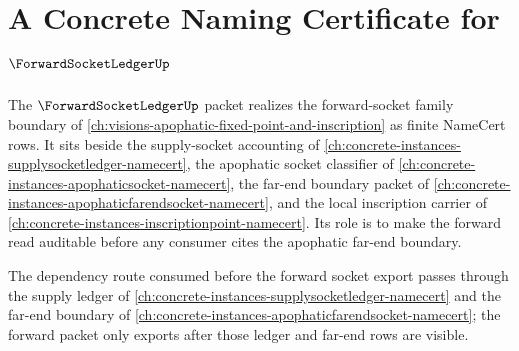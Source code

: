 \chapter{A Concrete Naming Certificate for $\ForwardSocketLedgerUp$}
\label{ch:concrete-instances-forward-socket-ledger-namecert}

The $\ForwardSocketLedgerUp$ packet realizes the forward-socket family boundary of \autoref{ch:visions-apophatic-fixed-point-and-inscription} as finite NameCert rows. It sits beside the supply-socket accounting of \autoref{ch:concrete-instances-supplysocketledger-namecert}, the apophatic socket classifier of \autoref{ch:concrete-instances-apophaticsocket-namecert}, the far-end boundary packet of \autoref{ch:concrete-instances-apophaticfarendsocket-namecert}, and the local inscription carrier of \autoref{ch:concrete-instances-inscriptionpoint-namecert}. Its role is to make the forward read auditable before any consumer cites the apophatic far-end boundary.

The dependency route consumed before the forward socket export passes through the supply ledger of \autoref{ch:concrete-instances-supplysocketledger-namecert} and the far-end boundary of \autoref{ch:concrete-instances-apophaticfarendsocket-namecert}; the forward packet only exports after those ledger and far-end rows are visible.

